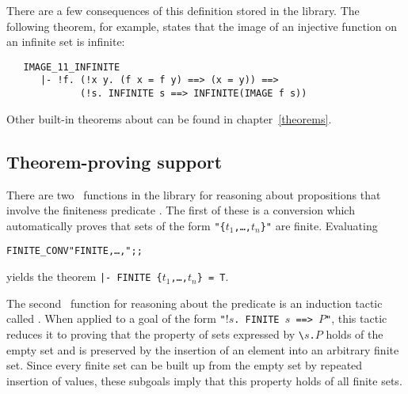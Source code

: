\noindent There are a few consequences of this definition stored in the
 library.  The following theorem, for example, states that the
image of an injective function on an infinite set is infinite:

\begin{hol}
\begin{verbatim}
   IMAGE_11_INFINITE
      |- !f. (!x y. (f x = f y) ==> (x = y)) ==>
             (!s. INFINITE s ==> INFINITE(IMAGE f s))
\end{verbatim}\end{hol}

\noindent Other built-in theorems about  can be found in
chapter~\ref{theorems}.

\subsection{Theorem-proving support}

There are two \ML\ functions in the  library for reasoning about
propositions that involve the finiteness predicate .
The
 first of these is a
conversion  which automatically proves that sets of the form
{\small\verb!"{!\tt$t_1$,\dots,$t_n$\verb!}"!} are finite.  Evaluating

\begin{hol}\begin{alltt}
   FINITE\_CONV "FINITE \lb{},\dots,\rb";;
\end{alltt}\end{hol}

\noindent yields the theorem
{\small\verb!|- FINITE {!\tt$t_1$,\dots,$t_n$\verb!} = T!}.%
%

The
second \ML\ function for
reasoning about the predicate  is an induction tactic called
.  When applied to a goal of the form
{\small\verb!"!!$s$\verb!. FINITE !$s$\verb! ==> !$P$\verb!"!}, this tactic
reduces it to proving that the property of sets expressed by
{\small\verb!\!$s$\verb!.!$P$} holds of the empty set and is preserved by the
insertion of an element into an arbitrary finite set.  Since every finite set
can be built up from the empty set by repeated insertion of values, these
subgoals imply that this property holds of all finite sets.

